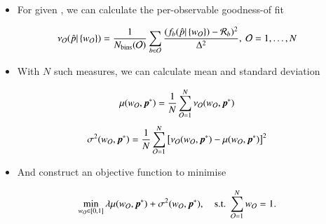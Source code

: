     \begin{itemize}
        \item For given \phat, we can calculate the per-observable goodness-of fit
    \end{itemize}
$$
    \nu_\mathcal{O}(\hat{p}|\left\{w_\mathcal{O}\right\}) =
    \frac{1}{N_\text{bins}(\mathcal{O})}
    \sum_{b\in \mathcal{O}}
  \frac{ (f_b(\hat{p}|\left\{w_\mathcal{O}\right\}) - \mathcal{R}_b)^2 }{  \Delta^2}, \ {\cal O} =1,\ldots, N
$$
\begin{itemize}
    \item With $N$ such measures, we can calculate mean and standard deviation
\end{itemize}
$$%
 \mu(w_{\cal O}, \p^*) = \frac{1}{N}\sum_{{\cal O}=1}^N \nu_{\cal O}(w_{\cal O}, \p^*)
$$%
$$%
 \sigma^2(w_{\cal O}, \p^*) = \frac{1}{N}\sum_{{\cal O}=1}^N \left[\nu_{\cal O}(w_{\cal O}, \p^*) -\mu(w_{\cal O}, \p^*)\right]^2
$$%
    \begin{itemize}
            \item And construct an objective function to minimise
        \end{itemize}
$$%
\min_{w_{\cal O}\in[0,1]} \lambda \mu(w_{\cal O}, \p^*) + \sigma^2(w_{\cal O}, \p^*),\quad \text{s.t. } \sum_{{\cal O}=1}^N w_{\cal O} =1.
$$%


